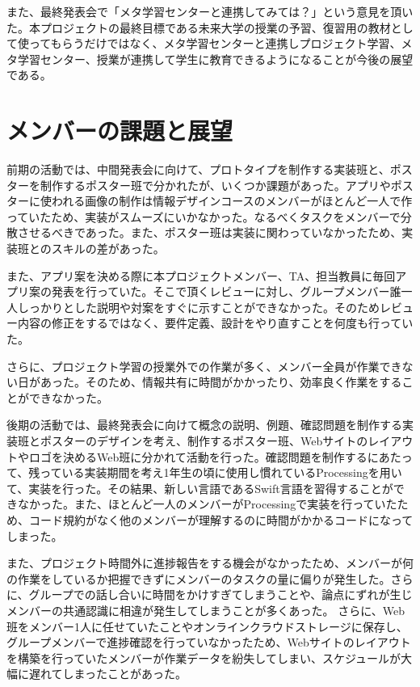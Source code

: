 \documentclass[openany,11pt,papersize]{jsbook}
\begin{document}
\par
また、最終発表会で「メタ学習センターと連携してみては？」という意見を頂いた。本プロジェクトの最終目標である未来大学の授業の予習、復習用の教材として使ってもらうだけではなく、メタ学習センターと連携しプロジェクト学習、メタ学習センター、授業が連携して学生に教育できるようになることが今後の展望である。



\section{メンバーの課題と展望}
前期の活動では、中間発表会に向けて、プロトタイプを制作する実装班と、ポスターを制作するポスター班で分かれたが、いくつか課題があった。アプリやポスターに使われる画像の制作は情報デザインコースのメンバーがほとんど一人で作っていたため、実装がスムーズにいかなかった。なるべくタスクをメンバーで分散させるべきであった。また、ポスター班は実装に関わっていなかったため、実装班とのスキルの差があった。
\par
また、アプリ案を決める際に本プロジェクトメンバー、TA、担当教員に毎回アプリ案の発表を行っていた。そこで頂くレビューに対し、グループメンバー誰一人しっかりとした説明や対案をすぐに示すことができなかった。そのためレビュー内容の修正をするではなく、要件定義、設計をやり直すことを何度も行っていた。
\par
さらに、プロジェクト学習の授業外での作業が多く、メンバー全員が作業できない日があった。そのため、情報共有に時間がかかったり、効率良く作業をすることができなかった。
\par
後期の活動では、最終発表会に向けて概念の説明、例題、確認問題を制作する実装班とポスターのデザインを考え、制作するポスター班、Webサイトのレイアウトやロゴを決めるWeb班に分かれて活動を行った。確認問題を制作するにあたって、残っている実装期間を考え1年生の頃に使用し慣れているProcessingを用いて、実装を行った。その結果、新しい言語であるSwift言語を習得することができなかった。また、ほとんど一人のメンバーがProcessingで実装を行っていたため、コード規約がなく他のメンバーが理解するのに時間がかかるコードになってしまった。
\par
また、プロジェクト時間外に進捗報告をする機会がなかったため、メンバーが何の作業をしているか把握できずにメンバーのタスクの量に偏りが発生した。さらに、グループでの話し合いに時間をかけすぎてしまうことや、論点にずれが生じメンバーの共通認識に相違が発生してしまうことが多くあった。
さらに、Web班をメンバー1人に任せていたことやオンラインクラウドストレージに保存し、グループメンバーで進捗確認を行っていなかったため、Webサイトのレイアウトを構築を行っていたメンバーが作業データを紛失してしまい、スケジュールが大幅に遅れてしまったことがあった。
\end{document}
